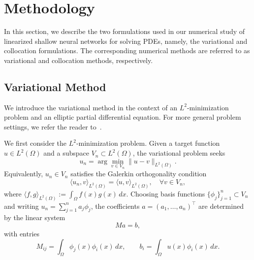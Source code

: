 \documentclass{article}
\def\NN{\mathbb{N}}
\def\SS{\mathbb{S}}
\newtheorem{theorem}{Theorem}
\theoremstyle{remark}
\begin{document}


\section{Methodology}\label{sec:methods}

In this section, we describe the two formulations used in our numerical study of linearized shallow neural networks for solving PDEs, namely, the variational and collocation formulations. 
The corresponding numerical methods are referred to as variational and collocation methods, respectively. 


\subsection{Variational Method}

We introduce the variational method in the context of an $L^2$-minimization problem and an elliptic partial differential equation. 
For more general problem settings, we refer the reader to~\cite{Xu:2020}. 

We first consider the $L^2$-minimization problem. 
Given a target function $u \in L^2(\Omega)$ and a subspace $V_n \subset L^2(\Omega)$, 
the variational problem seeks
\[
u_n = \arg\min_{v \in V_n} \|u - v\|_{L^2(\Omega)}.
\]
Equivalently, $u_n \in V_n$ satisfies the Galerkin orthogonality condition
\[
\langle u_n, v \rangle_{L^2(\Omega)} = \langle u, v \rangle_{L^2(\Omega)}, \quad \forall v \in V_n,
\]
where $\langle f,g \rangle_{L^2(\Omega)} := \int_\Omega f(x) g(x)\,dx$. 
Choosing basis functions $\{\phi_j\}_{j=1}^n \subset V_n$ 
and writing $u_n = \sum_{j=1}^n a_j \phi_j$, 
the coefficients $a=(a_1,\dots,a_n)^\top$ are determined by the linear system
\[
M a = b,
\]
with entries
\[
M_{ij} = \int_\Omega \phi_j(x)\phi_i(x)\,dx, 
\qquad
b_i = \int_\Omega u(x)\phi_i(x)\,dx .
\]
\end{document}
